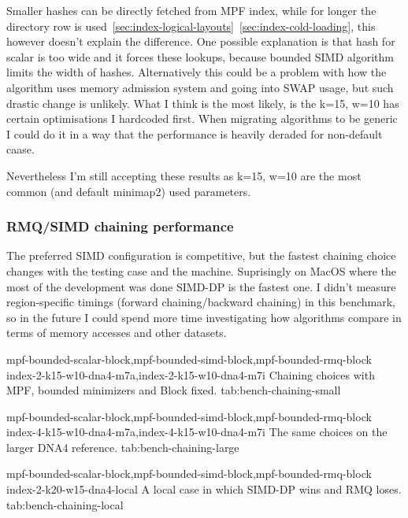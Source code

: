 Smaller hashes can be directly fetched from MPF index, while for longer the directory row is used~\ref{sec:index-logical-layouts}~\ref{sec:index-cold-loading}, this however doesn't explain the difference.
One possible explanation is that hash for scalar is too wide and it forces these lookups, because bounded SIMD algorithm limits the width of hashes.
Alternatively this could be a problem with how the algorithm uses memory admission system and going into SWAP usage, but such drastic change is unlikely.
What I think is the most likely, is the k=15, w=10 has certain optimisations I hardcoded first. When migrating algorithms to be generic I could do it in a way that the performance is heavily deraded for non-default caase.

Nevertheless I'm still accepting these results as k=15, w=10 are the most common (and default minimap2) used parameters.


\subsubsection{RMQ/SIMD chaining performance}
\label{sec:bench-chaining-choice}

The preferred SIMD configuration is competitive, but the fastest chaining
choice changes with the testing case and the machine. Suprisingly on MacOS where the most of the development was done SIMD-DP is the fastest one.
I didn't measure region-specific timings (forward chaining/backward chaining) in this benchmark, so in the future I could spend more time investigating how algorithms compare in terms of memory accesses and 
other datasets.

  {mpf-bounded-scalar-block,mpf-bounded-simd-block,mpf-bounded-rmq-block}
  {index-2-k15-w10-dna4-m7a,index-2-k15-w10-dna4-m7i}
  {Chaining choices with MPF, bounded minimizers and Block fixed.}
  {tab:bench-chaining-small}

  {mpf-bounded-scalar-block,mpf-bounded-simd-block,mpf-bounded-rmq-block}
  {index-4-k15-w10-dna4-m7a,index-4-k15-w10-dna4-m7i}
  {The same choices on the larger DNA4 reference.}
  {tab:bench-chaining-large}

  {mpf-bounded-scalar-block,mpf-bounded-simd-block,mpf-bounded-rmq-block}
  {index-2-k20-w15-dna4-local}
  {A local case in which SIMD-DP wins and RMQ loses.}
  {tab:bench-chaining-local}



